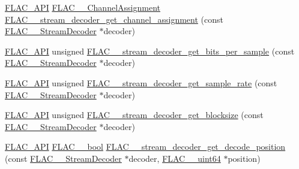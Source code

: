 \begin{DoxyCompactItemize}
\item 
\mbox{\hyperlink{group__flac__export_ga56ca07df8a23310707732b1c0007d6f5}{F\+L\+A\+C\+\_\+\+A\+PI}} \mbox{\hyperlink{group__flac__format_ga79855f8525672e37f299bbe02952ef9c}{F\+L\+A\+C\+\_\+\+\_\+\+Channel\+Assignment}} \mbox{\hyperlink{group__flac__stream__decoder_gad7906d840eef5c15ef5c8fe4571d1172}{F\+L\+A\+C\+\_\+\+\_\+stream\+\_\+decoder\+\_\+get\+\_\+channel\+\_\+assignment}} (const \mbox{\hyperlink{struct_f_l_a_c_____stream_decoder}{F\+L\+A\+C\+\_\+\+\_\+\+Stream\+Decoder}} $\ast$decoder)
\item 
\mbox{\hyperlink{group__flac__export_ga56ca07df8a23310707732b1c0007d6f5}{F\+L\+A\+C\+\_\+\+A\+PI}} unsigned \mbox{\hyperlink{group__flac__stream__decoder_ga2e4bae93f2ebf49babd88bb5fe54bd24}{F\+L\+A\+C\+\_\+\+\_\+stream\+\_\+decoder\+\_\+get\+\_\+bits\+\_\+per\+\_\+sample}} (const \mbox{\hyperlink{struct_f_l_a_c_____stream_decoder}{F\+L\+A\+C\+\_\+\+\_\+\+Stream\+Decoder}} $\ast$decoder)
\item 
\mbox{\hyperlink{group__flac__export_ga56ca07df8a23310707732b1c0007d6f5}{F\+L\+A\+C\+\_\+\+A\+PI}} unsigned \mbox{\hyperlink{group__flac__stream__decoder_ga83f1359028e0646c1e50c1aef0d9fd6d}{F\+L\+A\+C\+\_\+\+\_\+stream\+\_\+decoder\+\_\+get\+\_\+sample\+\_\+rate}} (const \mbox{\hyperlink{struct_f_l_a_c_____stream_decoder}{F\+L\+A\+C\+\_\+\+\_\+\+Stream\+Decoder}} $\ast$decoder)
\item 
\mbox{\hyperlink{group__flac__export_ga56ca07df8a23310707732b1c0007d6f5}{F\+L\+A\+C\+\_\+\+A\+PI}} unsigned \mbox{\hyperlink{group__flac__stream__decoder_ga9cd4807f4c6ee90338d271048fb28223}{F\+L\+A\+C\+\_\+\+\_\+stream\+\_\+decoder\+\_\+get\+\_\+blocksize}} (const \mbox{\hyperlink{struct_f_l_a_c_____stream_decoder}{F\+L\+A\+C\+\_\+\+\_\+\+Stream\+Decoder}} $\ast$decoder)
\item 
\mbox{\hyperlink{group__flac__export_ga56ca07df8a23310707732b1c0007d6f5}{F\+L\+A\+C\+\_\+\+A\+PI}} \mbox{\hyperlink{ordinals_8h_a95103469f1cbd78b8cf250194985b34e}{F\+L\+A\+C\+\_\+\+\_\+bool}} \mbox{\hyperlink{group__flac__stream__decoder_ga11507d25b6fdbd1efd5ee642923730fa}{F\+L\+A\+C\+\_\+\+\_\+stream\+\_\+decoder\+\_\+get\+\_\+decode\+\_\+position}} (const \mbox{\hyperlink{struct_f_l_a_c_____stream_decoder}{F\+L\+A\+C\+\_\+\+\_\+\+Stream\+Decoder}} $\ast$decoder, \mbox{\hyperlink{ordinals_8h_aa78c8c70a3eb8a58af7436f278acde8e}{F\+L\+A\+C\+\_\+\+\_\+uint64}} $\ast$position)
\item 

\end{DoxyCompactItemize}

